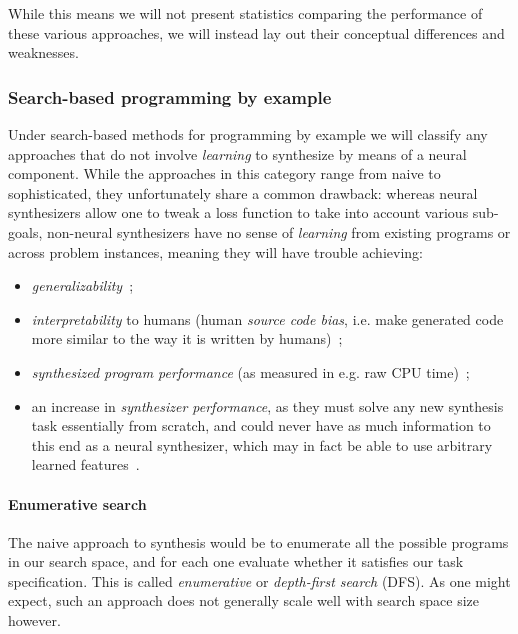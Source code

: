\documentclass{article}
\begin{document}
While this means we will not present statistics
comparing the performance of these various approaches,
we will instead lay out their conceptual differences and weaknesses.

\subsubsection{Search-based programming by example}

Under search-based methods for programming by example we will classify any approaches that do not involve \emph{learning} to synthesize by means of a neural component.
While the approaches in this category range from naive to sophisticated,
they unfortunately share a common drawback:
whereas neural synthesizers allow one to tweak a loss function to take into account various sub-goals,
non-neural synthesizers have no sense of \emph{learning}
from existing programs or across problem instances,
meaning they will have trouble achieving:
\begin{itemize}
    \item \emph{generalizability}~\citep{nps};
    \item \emph{interpretability} to humans (human \emph{source code bias}, i.e. make generated code more similar to the way it is written by humans)~\citep{nps};
    \item \emph{synthesized program performance} (as measured in e.g. raw CPU time)~\citep{schkufza2016stochastic};
    \item an increase in \emph{synthesizer performance},
    as they must solve any new synthesis task essentially from scratch,
    and could never have as much information to this end as a neural synthesizer,
    which may in fact be able to use arbitrary learned features~\citep{odena2020learning}.
\end{itemize}

\paragraph{Enumerative search}

The naive approach to synthesis would be to enumerate all the possible programs in our search space,
and for each one evaluate whether it satisfies our task specification.
This is called \emph{enumerative} or \emph{depth-first search} (DFS).
As one might expect, such an approach does not generally scale well with search space size however.

\end{document}
